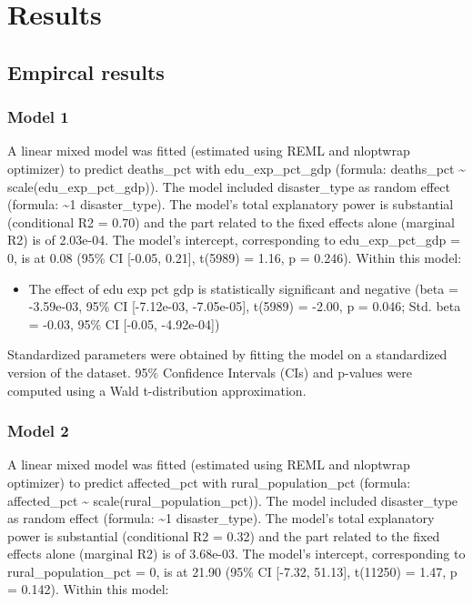 \documentclass[10pt,a4paper,onecolumn]{article}
\providecommand{\tightlist}{%
  \setlength{\itemsep}{0pt}\setlength{\parskip}{0pt}}
\begin{document}
\hypertarget{results}{%
\section{Results}\label{results}}

\hypertarget{empircal-results}{%
\subsection{Empircal results}\label{empircal-results}}

\hypertarget{model-1}{%
\subsubsection{Model 1}\label{model-1}}

A linear mixed model was fitted (estimated using REML and nloptwrap optimizer) to predict deaths\_pct with edu\_exp\_pct\_gdp (formula: deaths\_pct \textasciitilde{} scale(edu\_exp\_pct\_gdp)). The model included disaster\_type as
random effect (formula: \textasciitilde1 \textbar{} disaster\_type). The model's total explanatory power is substantial (conditional R2 = 0.70) and the part related to the fixed effects alone (marginal R2) is of 2.03e-04. The
model's intercept, corresponding to edu\_exp\_pct\_gdp = 0, is at 0.08 (95\% CI {[}-0.05, 0.21{]}, t(5989) = 1.16, p = 0.246). Within this model:

\begin{itemize}
\tightlist
\item
  The effect of edu exp pct gdp is statistically significant and negative (beta = -3.59e-03, 95\% CI {[}-7.12e-03, -7.05e-05{]}, t(5989) = -2.00, p = 0.046; Std. beta = -0.03, 95\% CI {[}-0.05, -4.92e-04{]})
\end{itemize}

Standardized parameters were obtained by fitting the model on a standardized version of the dataset. 95\% Confidence Intervals (CIs) and p-values were computed using a Wald t-distribution approximation.

\hypertarget{model-2}{%
\subsubsection{Model 2}\label{model-2}}

A linear mixed model was fitted (estimated using REML and nloptwrap optimizer) to predict affected\_pct with rural\_population\_pct (formula: affected\_pct \textasciitilde{} scale(rural\_population\_pct)). The model included
disaster\_type as random effect (formula: \textasciitilde1 \textbar{} disaster\_type). The model's total explanatory power is substantial (conditional R2 = 0.32) and the part related to the fixed effects alone (marginal R2) is of
3.68e-03. The model's intercept, corresponding to rural\_population\_pct = 0, is at 21.90 (95\% CI {[}-7.32, 51.13{]}, t(11250) = 1.47, p = 0.142). Within this model:
\end{document}
